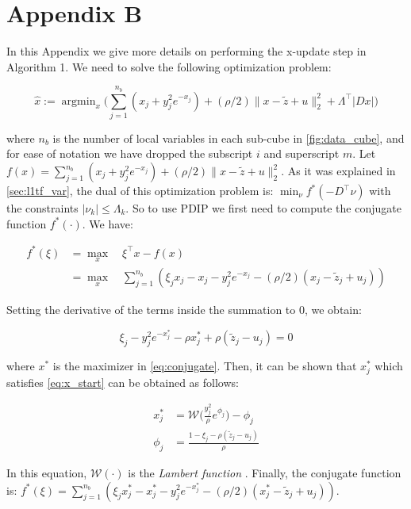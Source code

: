 \documentclass{article}
\DeclareMathOperator*{\argmin}{argmin}
\begin{document}
\section{Appendix B}
\label{sec:app_consADMM}

In this Appendix we give more details on performing the x-update step in Algorithm 1. We need to solve the following optimization problem:

\begin{equation}
\hat{x}:=\argmin_{x} \bigg( \sum_{j=1}^{n_b} (x_j + y_j^2e^{-x_j}) + (\rho/2) \lVert x-\tilde{z} + u \lVert_2^2 + \Lambda^\top |D x| \bigg)
\label{eq:x_update_opt}
\end{equation}

\noindent where $n_b$ is the number of local variables in each sub-cube in \autoref{fig:data_cube}, and for ease of notation we have dropped the subscript $i$ and superscript $m$. Let $f(x)=\sum_{j=1}^{n_b} (x_j + y_j^2e^{-x_j}) + (\rho/2) \lVert x-\tilde{z} + u \lVert_2^2$. As it was explained in \autoref{sec:l1tf_var}, the dual of this optimization problem is: $\min_\nu f^*(-D^\top\nu)$ with the constraints $|\nu_k| \le \Lambda_k$. So to use PDIP we first need to compute the conjugate function $f^*(\cdot)$. We have:


\begin{align}
f^*(\xi) & = \max_x \quad \xi^\top x - f(x)\\
& =  \max_x \quad \sum_{j=1}^{n_b} (\xi_jx_j - x_j - y_j^2e^{-x_j} - (\rho/2)(x_j-\tilde{z}_j+u_j))
\label{eq:conjugate}
\end{align}

Setting the derivative of the terms inside the summation to 0, we obtain:

\begin{equation}
\xi_j-y_j^2e^{-x_j^*}-\rho x_j^* + \rho (\tilde{z}_j-u_j)=0
\label{eq:x_start}
\end{equation}

\noindent where $x^*$ is the maximizer in \ref{eq:conjugate}. Then, it can be shown that $x_j^*$ which satisfies \eqref{eq:x_start} can be obtained as follows:

\begin{align}
x^*_j & = \mathscr{W}\bigg(\frac{y_j^2}{\rho} e^{\phi_j} \bigg) - \phi_j \\
\phi_j & =\frac{1-\xi_j-\rho(\tilde{z}_j-u_j)}{\rho}
\end{align}

In this equation, $\mathscr{W}(\cdot)$ is the \textit{Lambert function} \cite{corless_lambertw_1996}. Finally, the conjugate function is: $f^*(\xi) = \sum_{j=1}^{n_b} (\xi_jx^*_j - x^*_j - y_j^2e^{-x^*_j} - (\rho/2)(x^*_j-\tilde{z}_j+u_j))$.
\end{document}
